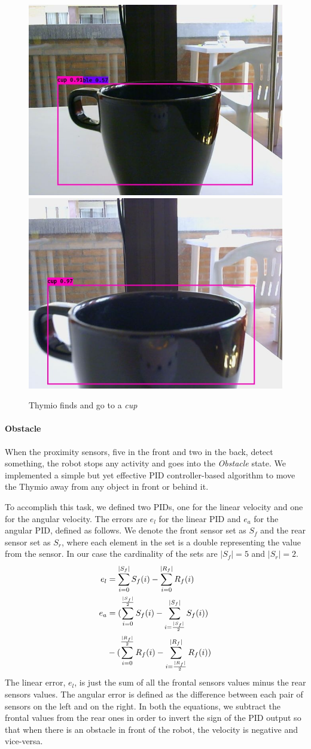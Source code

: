 \documentclass[letterpaper, 10 pt, conference]{ieeeconf}  %
\begin{document}
\begin{figure}[H]
\begin{center}
\end{center}	
\begin{center}
\includegraphics[width=0.48\linewidth]{images/cup/5}	
\includegraphics[width=0.48\linewidth]{images/cup/6}	
\end{center}	
\caption{Thymio finds and go to a \emph{cup}}
\end{figure}

\paragraph{Obstacle} When the proximity sensors, five in the front and two in the back, detect something,  the robot stops any activity and goes into the \emph{Obstacle} state. We implemented a simple but yet effective PID controller-based algorithm to move the Thymio away from any object in front or behind it. 

To accomplish this task, we defined two PIDs, one for the linear velocity and one for the angular velocity. The errors are $e_l$ for the linear PID and $e_a$ for the angular PID, defined as follows. We denote the front sensor set as $S_f$ and the rear sensor set as $S_r$, where each element in the set is a double representing the value from the sensor. In our case the cardinality of the sets are $|S_f| = 5$ and $|S_r|=2$.
\begin{align}
	e_l &= \sum\limits_{i=0}^{|S_f|} S_f(i) - \sum\limits_{i = 0}^{|R_f|} R_f(i) \\
	e_a &= (\sum\limits_{i=0}^{\frac{|S_f|}{2}} S_f(i) - \sum\limits_{i = \frac{|S_f|}{2} }^{|S_f|} S_f(i))  \\
	&- (\sum\limits_{i=0}^{\frac{|R_f|}{2}} R_f(i) - \sum\limits_{i = \frac{|R_f|}{2} }^{|R_f|} R_f(i))  \notag
\end{align}
The linear error, $e_l$, is just the sum of all the frontal sensors values minus the rear sensors values.  The angular error is defined as the difference between each pair of sensors on the left and on the right. In both the equations, we subtract the frontal values from the rear ones in order to invert the sign of the PID output so that when there is an obstacle in front of the robot, the velocity is negative and vice-versa. 
\end{document}
